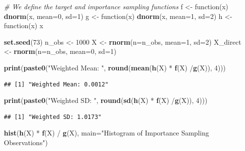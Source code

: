 \documentclass[]{article}
\newenvironment{Shaded}{\begin{snugshade}}{\end{snugshade}}
\newcommand{\KeywordTok}[1]{\textcolor[rgb]{0.13,0.29,0.53}{\textbf{{#1}}}}
\newcommand{\DataTypeTok}[1]{\textcolor[rgb]{0.13,0.29,0.53}{{#1}}}
\newcommand{\DecValTok}[1]{\textcolor[rgb]{0.00,0.00,0.81}{{#1}}}
\newcommand{\StringTok}[1]{\textcolor[rgb]{0.31,0.60,0.02}{{#1}}}
\newcommand{\CommentTok}[1]{\textcolor[rgb]{0.56,0.35,0.01}{\textit{{#1}}}}
\newcommand{\NormalTok}[1]{{#1}}
\begin{document}
\begin{Shaded}
\begin{Highlighting}[]
\CommentTok{# We define the target and importance sampling functions}
\NormalTok{f <-}\StringTok{ }\NormalTok{function(x) }\KeywordTok{dnorm}\NormalTok{(x, }\DataTypeTok{mean=}\DecValTok{0}\NormalTok{, }\DataTypeTok{sd=}\DecValTok{1}\NormalTok{)}
\NormalTok{g <-}\StringTok{ }\NormalTok{function(x) }\KeywordTok{dnorm}\NormalTok{(x, }\DataTypeTok{mean=}\DecValTok{1}\NormalTok{, }\DataTypeTok{sd=}\DecValTok{2}\NormalTok{)}
\NormalTok{h <-}\StringTok{ }\NormalTok{function(x) x}

\KeywordTok{set.seed}\NormalTok{(}\DecValTok{73}\NormalTok{)}
\NormalTok{n_obs <-}\StringTok{ }\DecValTok{1000}
\NormalTok{X <-}\StringTok{ }\KeywordTok{rnorm}\NormalTok{(}\DataTypeTok{n=}\NormalTok{n_obs, }\DataTypeTok{mean=}\DecValTok{1}\NormalTok{, }\DataTypeTok{sd=}\DecValTok{2}\NormalTok{)}
\NormalTok{X_direct <-}\StringTok{ }\KeywordTok{rnorm}\NormalTok{(}\DataTypeTok{n=}\NormalTok{n_obs, }\DataTypeTok{mean=}\DecValTok{0}\NormalTok{, }\DataTypeTok{sd=}\DecValTok{1}\NormalTok{)}

\KeywordTok{print}\NormalTok{(}\KeywordTok{paste0}\NormalTok{(}\StringTok{"Weighted Mean: "}\NormalTok{, }\KeywordTok{round}\NormalTok{(}\KeywordTok{mean}\NormalTok{(}\KeywordTok{h}\NormalTok{(X) *}\StringTok{ }\KeywordTok{f}\NormalTok{(X) /}\KeywordTok{g}\NormalTok{(X)), }\DecValTok{4}\NormalTok{)))}
\end{Highlighting}
\end{Shaded}

\begin{verbatim}
## [1] "Weighted Mean: 0.0012"
\end{verbatim}

\begin{Shaded}
\begin{Highlighting}[]
\KeywordTok{print}\NormalTok{(}\KeywordTok{paste0}\NormalTok{(}\StringTok{"Weighted SD: "}\NormalTok{, }\KeywordTok{round}\NormalTok{(}\KeywordTok{sd}\NormalTok{(}\KeywordTok{h}\NormalTok{(X) *}\StringTok{ }\KeywordTok{f}\NormalTok{(X) /}\KeywordTok{g}\NormalTok{(X)), }\DecValTok{4}\NormalTok{)))}
\end{Highlighting}
\end{Shaded}

\begin{verbatim}
## [1] "Weighted SD: 1.0173"
\end{verbatim}

\begin{Shaded}
\begin{Highlighting}[]
\KeywordTok{hist}\NormalTok{(}\KeywordTok{h}\NormalTok{(X) *}\StringTok{ }\KeywordTok{f}\NormalTok{(X) /}\StringTok{ }\KeywordTok{g}\NormalTok{(X), }\DataTypeTok{main=}\StringTok{"Histogram of Importance Sampling Observations"}\NormalTok{)}
\end{Highlighting}
\end{Shaded}
\end{document}
